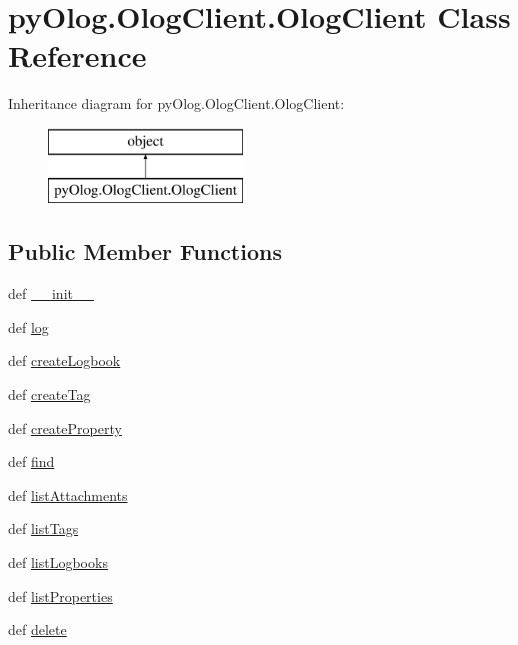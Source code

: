 \hypertarget{classpyOlog_1_1OlogClient_1_1OlogClient}{\section{py\-Olog.\-Olog\-Client.\-Olog\-Client Class Reference}
\label{classpyOlog_1_1OlogClient_1_1OlogClient}
}
Inheritance diagram for py\-Olog.\-Olog\-Client.\-Olog\-Client\-:\begin{figure}[H]
\begin{center}
\leavevmode
\includegraphics[height=2.000000cm]{classpyOlog_1_1OlogClient_1_1OlogClient}
\end{center}
\end{figure}
\subsection*{Public Member Functions}
\begin{DoxyCompactItemize}
\item 
def \hyperlink{classpyOlog_1_1OlogClient_1_1OlogClient_ae29e50bc4607672b6adeaa73c267030b}{\-\_\-\-\_\-init\-\_\-\-\_\-}
\item 
def \hyperlink{classpyOlog_1_1OlogClient_1_1OlogClient_a8b877d455ef7ebdf879254d8001f53bd}{log}
\item 
def \hyperlink{classpyOlog_1_1OlogClient_1_1OlogClient_aad5b526ddbf6a74259e625d763e503e6}{create\-Logbook}
\item 
def \hyperlink{classpyOlog_1_1OlogClient_1_1OlogClient_a99d70e3e90a5d42ef16c77f6286694d0}{create\-Tag}
\item 
def \hyperlink{classpyOlog_1_1OlogClient_1_1OlogClient_ac4fc7e86a08f87a32f2f3bbbed70b6b7}{create\-Property}
\item 
def \hyperlink{classpyOlog_1_1OlogClient_1_1OlogClient_a29d27bda8fb1172ec677e89246d84353}{find}
\item 
def \hyperlink{classpyOlog_1_1OlogClient_1_1OlogClient_a3d5a89b2130b434d84fb4d8d49e4c701}{list\-Attachments}
\item 
def \hyperlink{classpyOlog_1_1OlogClient_1_1OlogClient_aa0d07acad5b961c3af1fd81be48f33ec}{list\-Tags}
\item 
def \hyperlink{classpyOlog_1_1OlogClient_1_1OlogClient_a6f9af8ff00f272a5150ac1e4c457dfe6}{list\-Logbooks}
\item 
def \hyperlink{classpyOlog_1_1OlogClient_1_1OlogClient_a2609b79d8b10923556b9db7987164239}{list\-Properties}
\item 
def \hyperlink{classpyOlog_1_1OlogClient_1_1OlogClient_a7d072d6a9e63e4a99242d8bdcc20e8db}{delete}
\end{DoxyCompactItemize}


